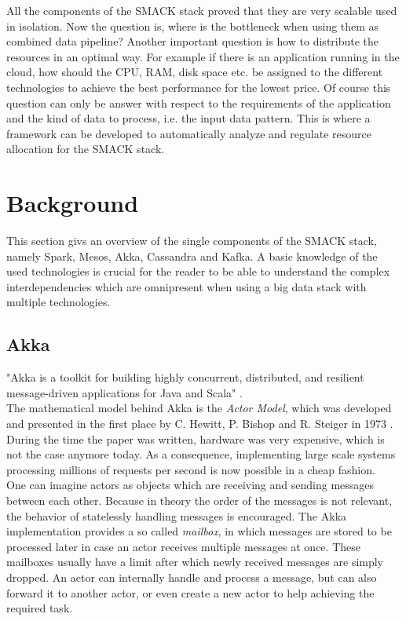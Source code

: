 All the components of the SMACK stack proved that they are very scalable used in isolation.
Now the question is, where is the bottleneck when using them as combined data pipeline?
Another important question is how to distribute the resources in an optimal way.
For example if there is an application running in the cloud, how should the CPU, RAM, disk space etc. be assigned to the different technologies to achieve the best performance for the lowest price.
Of course this question can only be answer with respect to the requirements of the application and the kind of data to process, i.e. the input data pattern.
This is where a framework can be developed to automatically analyze and regulate resource allocation for the SMACK stack.\\


\section{Background}
This section givs an overview of the single components of the SMACK stack, namely Spark, Mesos, Akka, Cassandra and Kafka.
A basic knowledge of the used technologies is crucial for the reader to be able to understand the complex interdependencies which are omnipresent when using a big data stack with multiple technologies.

\subsection{Akka}
"Akka is a toolkit for building highly concurrent, distributed, and resilient message-driven applications for Java and Scala" \cite{akka_web}.\\
The mathematical model behind Akka is the \textit{Actor Model}, which was developed and presented in the first place by C. Hewitt, P. Bishop and R. Steiger in 1973 \cite{hewitt1973session}.
During the time the paper was written, hardware was very expensive, which is not the case anymore today.
As a consequence, implementing large scale systems processing millions of requests per second is now possible in a cheap fashion.\\

One can imagine actors as objects which are receiving and sending messages between each other.
Because in theory the order of the messages is not relevant, the behavior of statelessly handling messages is encouraged.
The Akka implementation provides a so called \textit{mailbox}, in which messages are stored to be processed later in case an actor receives multiple messages at once.
These mailboxes usually have a limit after which newly received messages are simply dropped.
An actor can internally handle and process a message, but can also forward it to another actor, or even create a new actor to help achieving the required task.\\

